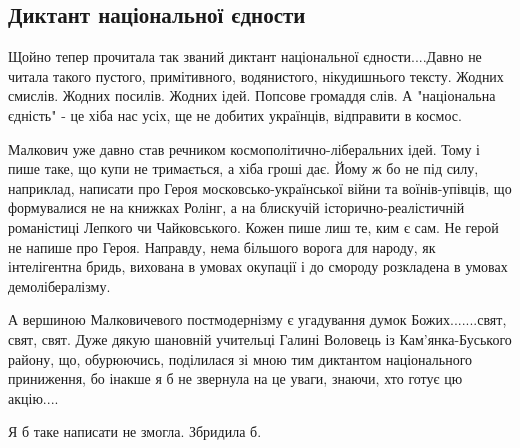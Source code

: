  
 
 

\subsection{Диктант національної єдности}

Щойно тепер прочитала так званий диктант національної єдности....Давно не
читала такого пустого, примітивного, водянистого, нікудишнього тексту. Жодних
смислів. Жодних посилів. Жодних ідей. Попсове громаддя слів. А "національна
єдність" - це хіба нас усіх, ще не добитих українців, відправити в космос.

Малкович уже давно став речником космополітично-ліберальних ідей. Тому і пише
таке, що купи не тримається, а хіба гроші дає. Йому ж бо не під силу,
наприклад, написати про Героя московсько-української війни та воїнів-упівців,
що формувалися не на книжках Ролінг, а на блискучій історично-реалістичній
романістиці Лепкого чи Чайковського. Кожен пише лиш те, ким є сам. Не герой не
напише про Героя. Направду, нема більшого ворога для народу, як інтелігентна
бридь, вихована в умовах окупації і до смороду розкладена в умовах
демолібералізму. 

А вершиною  Малковичевого постмодернізму є угадування думок Божих.......свят,
свят, свят.  Дуже дякую шановній учительці Галині Воловець із Кам'янка-Буського
району, що, обурюючись, поділилася зі мною тим диктантом національного
приниження, бо інакше я б не звернула на це уваги, знаючи, хто готує цю
акцію.... 

Я б таке написати не змогла. Збридила б.
